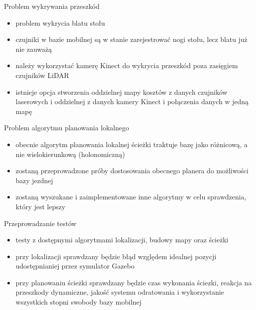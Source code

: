 \begin{frame}
{Problem wykrywania przeszkód}
	\begin{itemize}
		\item problem wykrycia blatu stołu
		\item czujniki w bazie mobilnej są w stanie zarejestrować nogi stołu, lecz blatu już nie zauważą
		\item należy wykorzystać kamerę Kinect do wykrycia przeszkód poza zasięgiem czujników LiDAR
		\item istnieje opcja stworzenia oddzielnej mapy kosztów z danych czujników laserowych i oddzielnej z danych kamery Kinect i połączenia danych w jedną mapę
	\end{itemize}
\end{frame}

\begin{frame}
{Problem algorytmu planowania lokalnego}
	\begin{itemize}
		\item obecnie algorytm planowania lokalnej ścieżki traktuje bazę jako różnicową, a nie wielokierunkową (holonomiczną)
		\item zostaną przeprowadzone próby dostosowania obecnego planera do możliwości bazy jezdnej
		\item zostaną wyszukane i zaimplementowane inne algorytmy w celu sprawdzenia, który jest lepszy
	\end{itemize}
\end{frame}

\begin{frame}
{Przeprowadzanie testów}
	\begin{itemize}
		\item testy z dostępnymi algorytmami lokalizacji, budowy mapy oraz ścieżki
		\item przy lokalizacji sprawdzany będzie błąd względem idealnej pozycji udostępnianiej przez symulator Gazebo
		\item przy planowaniu ścieżki sprawdzany będzie czas wykonania ściezki, reakcja na przeszkody dynamiczne, jakość systemu odratowania i wykorzystanie wszystkich stopni swobody bazy mobilnej
	\end{itemize}
\end{frame}